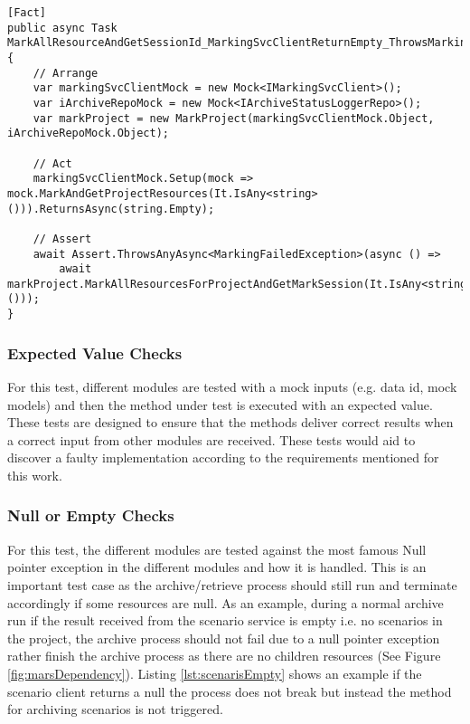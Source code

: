 \newpage
\begin{lstlisting}[language={[Sharp]C}, caption={Exception catch test example}, captionpos=b,label={lst:exceptionCatch}]
[Fact]
public async Task MarkAllResourceAndGetSessionId_MarkingSvcClientReturnEmpty_ThrowsMarkingFailedException()
{
    // Arrange
    var markingSvcClientMock = new Mock<IMarkingSvcClient>();
    var iArchiveRepoMock = new Mock<IArchiveStatusLoggerRepo>();
    var markProject = new MarkProject(markingSvcClientMock.Object, iArchiveRepoMock.Object);
    
    // Act 
    markingSvcClientMock.Setup(mock => mock.MarkAndGetProjectResources(It.IsAny<string>())).ReturnsAsync(string.Empty);
    
    // Assert
    await Assert.ThrowsAnyAsync<MarkingFailedException>(async () =>
        await markProject.MarkAllResourcesForProjectAndGetMarkSession(It.IsAny<string>()));
}
\end{lstlisting}

\subsubsection{Expected Value Checks}
For this test, different modules are tested with a mock inputs (e.g. data id, mock models) and then the method under test is executed with an 
expected value. These tests are designed to ensure that the methods deliver correct results when a correct input from other modules are received.
These tests would aid to discover a faulty implementation according to the requirements mentioned for this work.

\subsubsection{Null or Empty Checks}
For this test, the different modules are tested against the most famous Null pointer exception in the different modules and how it is handled. This is an important
test case as the archive/retrieve process should still run and terminate accordingly if some resources are null. As an example, during a normal archive run if the result received from
the scenario service  is empty i.e. no scenarios in the project, the archive process should not fail due to a null pointer exception rather finish the archive process
as there are no children resources (See Figure \ref{fig:marsDependency}). Listing \ref{lst:scenarisEmpty} shows an example if the scenario client returns a null 
the process does not break but instead the method for archiving scenarios is not triggered. 

